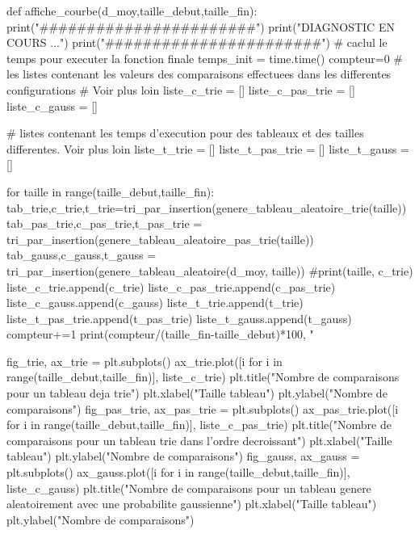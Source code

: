 \documentclass[a4paper,12pt]{article}
\begin{document}
\begin{python}
  def affiche_courbe(d_moy,taille_debut,taille_fin):
    print("#######################")
    print("DIAGNOSTIC EN COURS ...")
    print("#######################")
    # caclul le temps pour executer la fonction finale
    temps_init = time.time()
    compteur=0
    # les listes contenant les valeurs des comparaisons effectuees dans les differentes configurations
    # Voir plus loin
    liste_c_trie = []
    liste_c_pas_trie = []
    liste_c_gauss = []
    
    # listes contenant les temps d'execution pour des tableaux et des tailles differentes. Voir plus loin
    liste_t_trie = []
    liste_t_pas_trie = []
    liste_t_gauss = []
    
    for taille in range(taille_debut,taille_fin):
        tab_trie,c_trie,t_trie=tri_par_insertion(genere_tableau_aleatoire_trie(taille))
        tab_pas_trie,c_pas_trie,t_pas_trie = tri_par_insertion(genere_tableau_aleatoire_pas_trie(taille))
        tab_gauss,c_gauss,t_gauss = tri_par_insertion(genere_tableau_aleatoire(d_moy, taille))
        #print(taille, c_trie)
        liste_c_trie.append(c_trie)
        liste_c_pas_trie.append(c_pas_trie)
        liste_c_gauss.append(c_gauss)
        liste_t_trie.append(t_trie)
        liste_t_pas_trie.append(t_pas_trie)
        liste_t_gauss.append(t_gauss)
        compteur+=1
        print(compteur/(taille_fin-taille_debut)*100, "%
        
    fig_trie, ax_trie = plt.subplots()
    ax_trie.plot([i for i in range(taille_debut,taille_fin)], liste_c_trie)
    plt.title("Nombre de comparaisons pour un tableau deja trie")
    plt.xlabel("Taille tableau")
    plt.ylabel("Nombre de comparaisons")
    fig_pas_trie, ax_pas_trie = plt.subplots()
    ax_pas_trie.plot([i for i in range(taille_debut,taille_fin)], liste_c_pas_trie)
    plt.title("Nombre de comparaisons pour un tableau trie dans l'ordre decroissant")
    plt.xlabel("Taille tableau")
    plt.ylabel("Nombre de comparaisons")
    fig_gauss, ax_gauss = plt.subplots()
    ax_gauss.plot([i for i in range(taille_debut,taille_fin)], liste_c_gauss)
    plt.title("Nombre de comparaisons pour un tableau genere \n aleatoirement avec une probabilite gaussienne")
    plt.xlabel("Taille tableau")
    plt.ylabel("Nombre de comparaisons")
    

\end{python}
\end{document}
